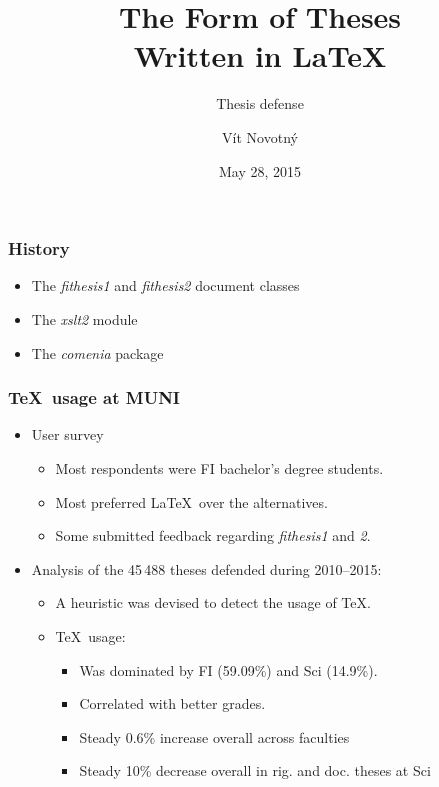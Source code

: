 \documentclass[12pt]{beamer}
\title{The Form of Theses\\ Written in \LaTeX}
\subtitle{Thesis defense}
\date{May 28, 2015}
\author{Vít Novotný}
\institute[FI MU]{Faculty of Informatics,\\Masaryk University in Brno}
\begin{document}
  \frame{\maketitle}
  \begin{frame}
    \frametitle{History}
    \begin{itemize}[<+->]
      \item The \emph{fithesis1} and \emph{fithesis2} document classes
      \item The \emph{xslt2} module
      \item The \emph{comenia} package
    \end{itemize}
  \end{frame}
  \begin{frame}
    \frametitle{\TeX\ usage at MUNI}
    \begin{itemize}[<+->]
      \item User survey
      \begin{itemize}
        \item Most respondents were FI bachelor's degree students.
        \item Most preferred \LaTeX\ over the alternatives.
        \item Some submitted feedback regarding \emph{fithesis1} and \emph{2}.
      \end{itemize}
      \item Analysis of the 45\,488 theses defended during 2010--2015:
      \begin{itemize}
        \item A heuristic was devised to detect the usage of \TeX.
        \item \TeX\ usage:
          \begin{itemize}
            \item Was dominated by FI (59.09\%) and Sci (14.9\%).
            \item Correlated with better grades.
            \item Steady 0.6\% increase overall across faculties
            \item Steady 10\% decrease overall in rig. and doc. theses at Sci
          \end{itemize}
      \end{itemize}
    \end{itemize}
  \end{frame}
\end{document}

